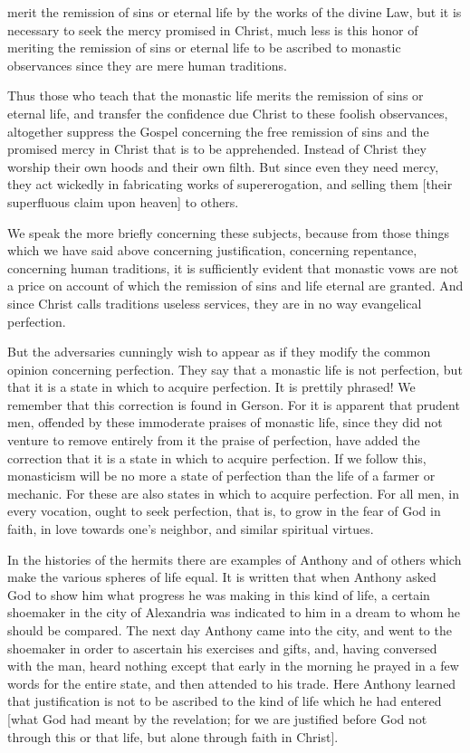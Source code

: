 merit the remission of sins or eternal life by the works of the
divine Law, but it is necessary to seek the mercy promised in Christ,
much less is this honor of meriting the remission of sins or eternal
life to be ascribed to monastic observances since they are mere human
traditions.

Thus those who teach that the monastic life merits the remission of
sins or eternal life, and transfer the confidence due Christ to these
foolish observances, altogether suppress the Gospel concerning the
free remission of sins and the promised mercy in Christ that is to be
apprehended.  Instead of Christ they worship their own hoods and
their own filth.  But since even they need mercy, they act wickedly
in fabricating works of supererogation, and selling them [their
superfluous claim upon heaven] to others.

We speak the more briefly concerning these subjects, because from
those things which we have said above concerning justification,
concerning repentance, concerning human traditions, it is
sufficiently evident that monastic vows are not a price on account of
which the remission of sins and life eternal are granted.  And since
Christ calls traditions useless services, they are in no way
evangelical perfection.

But the adversaries cunningly wish to appear as if they modify the
common opinion concerning perfection.  They say that a monastic life
is not perfection, but that it is a state in which to acquire
perfection.  It is prettily phrased!  We remember that this
correction is found in Gerson.  For it is apparent that prudent men,
offended by these immoderate praises of monastic life, since they did
not venture to remove entirely from it the praise of perfection, have
added the correction that it is a state in which to acquire
perfection.  If we follow this, monasticism will be no more a state
of perfection than the life of a farmer or mechanic.  For these are
also states in which to acquire perfection.  For all men, in every
vocation, ought to seek perfection, that is, to grow in the fear of
God in faith, in love towards one's neighbor, and similar spiritual
virtues.

In the histories of the hermits there are examples of Anthony and of
others which make the various spheres of life equal.  It is written
that when Anthony asked God to show him what progress he was making
in this kind of life, a certain shoemaker in the city of Alexandria
was indicated to him in a dream to whom he should be compared.  The
next day Anthony came into the city, and went to the shoemaker in
order to ascertain his exercises and gifts, and, having conversed
with the man, heard nothing except that early in the morning he
prayed in a few words for the entire state, and then attended to his
trade. Here Anthony learned that justification is not to be ascribed to
the kind of life which he had entered [what God had meant by the
revelation; for we are justified before God not through this or that
life, but alone through faith in Christ].

